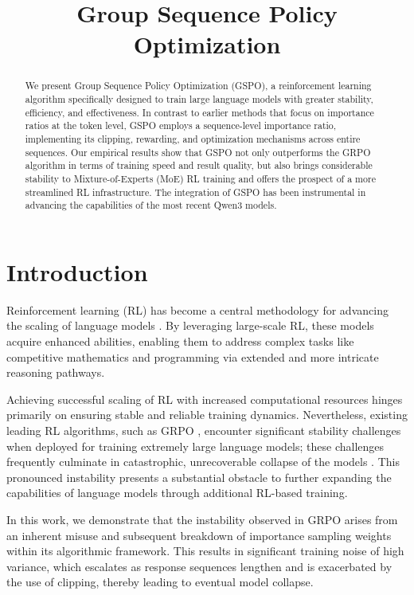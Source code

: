 \title{Group Sequence Policy Optimization}

\begin{abstract}
We present Group Sequence Policy Optimization (GSPO), a reinforcement learning algorithm specifically designed to train large language models with greater stability, efficiency, and effectiveness. In contrast to earlier methods that focus on importance ratios at the token level, GSPO employs a sequence-level importance ratio, implementing its clipping, rewarding, and optimization mechanisms across entire sequences. Our empirical results show that GSPO not only outperforms the GRPO algorithm in terms of training speed and result quality, but also brings considerable stability to Mixture-of-Experts (MoE) RL training and offers the prospect of a more streamlined RL infrastructure. The integration of GSPO has been instrumental in advancing the capabilities of the most recent Qwen3 models.
\end{abstract}

\section{Introduction}
\label{sec:intro}

Reinforcement learning (RL) has become a central methodology for advancing the scaling of language models \citep{o1,dpsk-r1,qwq32b,qwen3}. By leveraging large-scale RL, these models acquire enhanced abilities, enabling them to address complex tasks like competitive mathematics and programming via extended and more intricate reasoning pathways.

Achieving successful scaling of RL with increased computational resources hinges primarily on ensuring stable and reliable training dynamics. Nevertheless, existing leading RL algorithms, such as GRPO \citep{grpo}, encounter significant stability challenges when deployed for training extremely large language models; these challenges frequently culminate in catastrophic, unrecoverable collapse of the models \citep{qwen3, minimax-m1}. This pronounced instability presents a substantial obstacle to further expanding the capabilities of language models through additional RL-based training.

In this work, we demonstrate that the instability observed in GRPO arises from an inherent misuse and subsequent breakdown of importance sampling weights within its algorithmic framework. This results in significant training noise of high variance, which escalates as response sequences lengthen and is exacerbated by the use of clipping, thereby leading to eventual model collapse.

